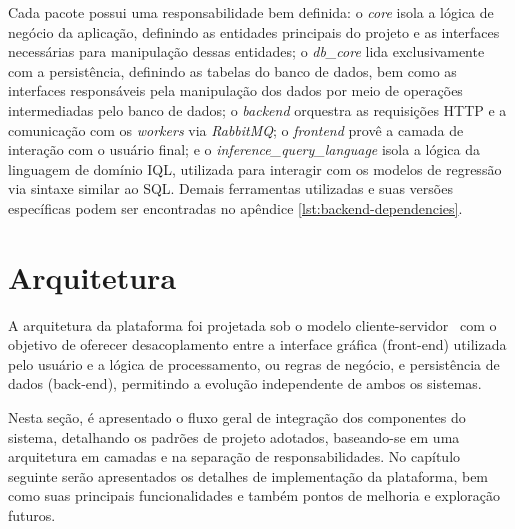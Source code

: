 
Cada pacote possui uma responsabilidade bem definida: o \textit{core} isola a lógica de negócio da aplicação, definindo as entidades principais do projeto e as interfaces necessárias para manipulação dessas entidades; o \textit{db\_core} lida exclusivamente com a persistência, definindo as tabelas do banco de dados, bem como as interfaces responsáveis pela manipulação dos dados por meio de operações intermediadas pelo banco de dados; o \textit{backend} orquestra as requisições HTTP e a comunicação com os \textit{workers} via \textit{RabbitMQ}; o \textit{frontend} provê a camada de interação com o usuário final; e o \textit{inference\_query\_language} isola a lógica da linguagem de domínio IQL, utilizada para interagir com os modelos de regressão via sintaxe similar ao SQL. Demais ferramentas utilizadas e suas versões específicas podem ser encontradas no apêndice \ref{lst:backend-dependencies}.

\section{Arquitetura}

A arquitetura da plataforma foi projetada sob o modelo cliente-servidor~\cite{sommerville2011software} com o objetivo de oferecer desacoplamento entre a interface gráfica (front-end) utilizada pelo usuário e a lógica de processamento, ou regras de negócio, e persistência de dados (back-end), permitindo a evolução independente de ambos os sistemas.

Nesta seção, é apresentado o fluxo geral de integração dos componentes do sistema, detalhando os padrões de projeto adotados, baseando-se em uma arquitetura em camadas e na separação de responsabilidades. No capítulo seguinte serão apresentados os detalhes de implementação da plataforma, bem como suas principais funcionalidades e também pontos de melhoria e exploração futuros.

